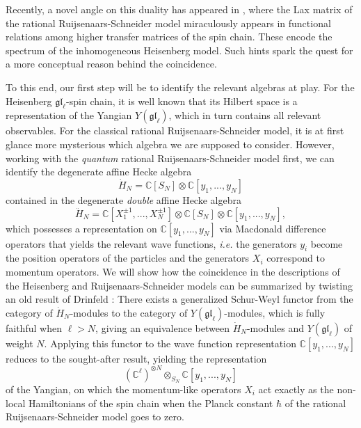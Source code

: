 \documentclass[11pt]{report}
\theoremstyle{definition}
\theoremstyle{remark}
\theoremstyle{remark}
\newcommand{\C}{\mathbb{C}}
\begin{document}
Recently, a novel angle on this duality has appeared in \cite{book:arutyunov:betheAnsatz}, where the Lax matrix of the rational Ruijsenaars-Schneider model miraculously appears in functional relations among higher transfer matrices of the spin chain. These encode the spectrum of the inhomogeneous Heisenberg model. Such hints spark the quest for a more conceptual reason behind the coincidence.

To this end, our first step will be to identify the relevant algebras at play. For the Heisenberg $\mathfrak{gl}_\ell$-spin chain, it is well known that its Hilbert space is a representation of the Yangian $Y(\mathfrak{gl}_\ell)$, which in turn contains all relevant observables. For the classical rational Ruijsenaars-Schneider model, it is at first glance more mysterious which algebra we are supposed to consider. However, working with the \emph{quantum} rational Ruijsenaars-Schneider model first, we can identify the degenerate affine Hecke algebra
\begin{equation*}
\dot H_N = \C[S_N] \otimes \C[y_1,...,y_N]
\end{equation*}
contained in the degenerate \emph{double} affine Hecke algebra
\begin{equation*}
\ddot H_N = \C[X_1^{\pm 1},...,X_N^{\pm 1}] \otimes \C[S_N] \otimes \C[y_1,...,y_N],
\end{equation*}
which possesses a representation on $\C[y_1,...,y_N]$ via Macdonald difference operators that yields the relevant wave functions, \emph{i.e.} the generators $y_i$ become the position operators of the particles and the generators $X_i$ correspond to momentum operators. We will show how the coincidence in the descriptions of the Heisenberg and Ruijsenaars-Schneider models can be summarized by twisting an old result of Drinfeld \cite{article:drinfeld:1986}: There exists a generalized Schur-Weyl functor from the category of $\dot H_N$-modules to the category of $Y(\mathfrak{gl}_\ell)$-modules, which is fully faithful when $\ell > N$, giving an equivalence between $\dot H_N$-modules and $Y(\mathfrak{gl}_\ell)$ of weight $N$. Applying this functor to the wave function representation $\C[y_1,...,y_N]$ reduces to the sought-after result, yielding the representation
\begin{equation*}
(\C^\ell)^{\otimes N} \otimes_{S_N} \C[y_1,...,y_N]
\end{equation*}
of the Yangian, on which the momentum-like operators $X_i$ act exactly as the non-local Hamiltonians of the spin chain when the Planck constant $\hbar$ of the rational Ruijsenaars-Schneider model goes to zero.
\end{document}
